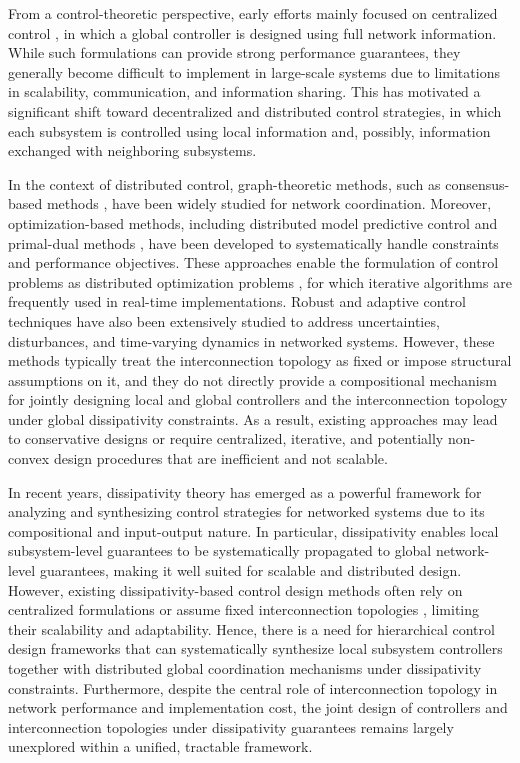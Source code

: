 \documentclass[letterpaper, 10 pt, conference]{ieeeconf}%
\newcommand{\0}{\mathbf{0}}
\begin{document}
From a control-theoretic perspective, early efforts mainly focused on centralized control \cite{zhang2001stability,silva2008optimal}, in which a global controller is designed using full network information. While such formulations can provide strong performance guarantees, they generally become difficult to implement in large-scale systems due to limitations in scalability, communication, and information sharing. This has motivated a significant shift toward decentralized \cite{rotkowitz2005characterization} and distributed \cite{olfati2007consensus} control strategies, in which each subsystem is controlled using local information and, possibly, information exchanged with neighboring subsystems. 

In the context of distributed control, graph-theoretic methods, such as consensus-based methods \cite{bai2024distributed}, have been widely studied for network coordination. Moreover, optimization-based methods, including distributed model predictive control \cite{wei2024robust,bai2025distributed} and primal-dual methods \cite{maggiar2025consensus}, have been developed to systematically handle constraints and performance objectives. These approaches enable the formulation of control problems as distributed optimization problems \cite{neal2011distributed}, for which iterative algorithms are frequently used in real-time implementations. Robust \cite{boyd1994linear,zhou1996robust} and adaptive \cite{ioannou1996robust} control techniques have also been extensively studied to address uncertainties, disturbances, and time-varying dynamics in networked systems. However, these methods typically treat the interconnection topology as fixed or impose structural assumptions on it, and they do not directly provide a compositional mechanism for jointly designing local and global controllers and the interconnection topology under global dissipativity constraints. As a result, existing approaches may lead to conservative designs or require centralized, iterative, and potentially non-convex design procedures that are inefficient and not scalable.

In recent years, dissipativity theory has emerged as a powerful framework for analyzing and synthesizing control strategies for networked systems due to its compositional and input-output nature. In particular, dissipativity enables local subsystem-level guarantees to be systematically propagated to global network-level guarantees, making it well suited for scalable and distributed design. However, existing dissipativity-based control design methods often rely on centralized formulations \cite{bahmani2020lmi} or assume fixed interconnection topologies \cite{sun2023dissipativity,nguyen2024improvement}, limiting their scalability and adaptability. Hence, there is a need for hierarchical control design frameworks that can systematically synthesize local subsystem controllers together with distributed global coordination mechanisms under dissipativity constraints. Furthermore, despite the central role of interconnection topology in network performance and implementation cost, the joint design of controllers and interconnection topologies under dissipativity guarantees remains largely unexplored within a unified, tractable framework.
\end{document}
